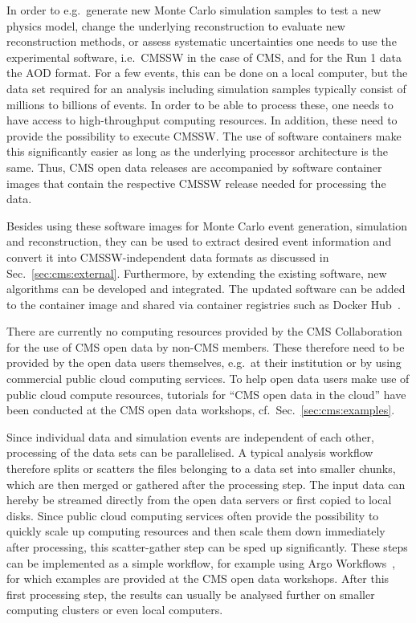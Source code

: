 \documentclass[10pt]{article}
\begin{document}
In order to e.g.\ generate new Monte Carlo simulation samples to test a new physics model, change the underlying reconstruction to evaluate new reconstruction methods, or assess systematic uncertainties one needs to use the experimental software, i.e.\ CMSSW in the case of CMS, and for the Run 1 data the AOD format.
For a few events, this can be done on a local computer, but the data set required for an analysis including simulation samples typically consist of millions to billions of events.
In order to be able to process these, one needs to have access to high-throughput computing resources.
In addition, these need to provide the possibility to execute CMSSW.
The use of software containers make this significantly easier as long as the underlying processor architecture is the same.
Thus, CMS open data releases are accompanied by software container images that contain the respective CMSSW release needed for processing the data.

Besides using these software images for Monte Carlo event generation, simulation and reconstruction, they can be used to extract desired event information and convert it into CMSSW-independent data formats as discussed in Sec.~\ref{sec:cms:external}.
Furthermore, by extending the existing software, new algorithms can be developed and integrated.
The updated software can be added to the container image and shared via container registries such as Docker Hub~\cite{dockerhub}.

There are currently no computing resources provided by the CMS Collaboration for the use of CMS open data by non-CMS members.
These therefore need to be provided by the open data users themselves, e.g.\ at their institution or by using commercial public cloud computing services.
%
To help open data users make use of public cloud compute resources, tutorials for ``CMS open data in the cloud'' have been conducted at the CMS open data workshops, cf.\ Sec.~\ref{sec:cms:examples}.

Since individual data and simulation events are independent of each other, processing of the data sets can be parallelised.
A typical analysis workflow therefore splits or scatters the files belonging to a data set into smaller chunks, which are then merged or gathered after the processing step.
The input data can hereby be streamed directly from the open data servers or first copied to local disks.
Since public cloud computing services often provide the possibility to quickly scale up computing resources and then scale them down immediately after processing, this scatter-gather step can be sped up significantly.
These steps can be implemented as a simple workflow, for example using Argo Workflows~\cite{argo}, for which examples are provided at the CMS open data workshops.
After this first processing step, the results can usually be analysed further on smaller computing clusters or even local computers.
\end{document}
